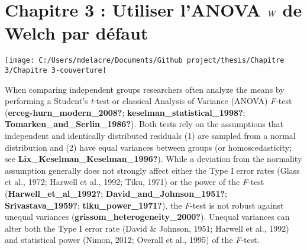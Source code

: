 \documentclass[
  english,
  man]{apa6}
\author{\phantom{0}}
\date{}
\affiliation{\phantom{0}}
\begin{document}
\hypertarget{chapitre-3-utiliser-lanova-bf-emph-w-de-welch-par-duxe9faut}{%
\section{\texorpdfstring{Chapitre 3 : Utiliser l'ANOVA \(\bf \emph W\) de Welch par défaut}{Chapitre 3 : Utiliser l'ANOVA \textbackslash bf \textbackslash emph W de Welch par défaut}}\label{chapitre-3-utiliser-lanova-bf-emph-w-de-welch-par-duxe9faut}}

\begin{center}\texttt{[image: C:/Users/mdelacre/Documents/Github project/thesis/Chapitre 3/Chapitre 3-couverture]} \end{center}

When comparing independent groups researchers often analyze the means by performing a Student's \emph{t}-test or classical Analysis of Variance (ANOVA) \emph{F}-test (\textbf{erceg-hurn\_modern\_2008?}; \textbf{keselman\_statistical\_1998?}; \textbf{Tomarken\_and\_Serlin\_1986?}). Both tests rely on the assumptions that independent and identically distributed residuals (1) are sampled from a normal distribution and (2) have equal variances between groups (or homoscedasticity; see \textbf{Lix\_Keselman\_Keselman\_1996?}). While a deviation from the normality assumption generally does not strongly affect either the Type I error rates (Glass et al., 1972; Harwell et al., 1992; Tiku, 1971) or the power of the \emph{F}-test (\textbf{Harwell\_et\_al\_1992?}; \textbf{David\_and\_Johnson\_1951?}; \textbf{Srivastava\_1959?}; \textbf{tiku\_power\_1971?}), the \emph{F}-test is not robust against unequal variances (\textbf{grissom\_heterogeneity\_2000?}). Unequal variances can alter both the Type I error rate (David \(\&\) Johnson, 1951; Harwell et al., 1992) and statistical power (Nimon, 2012; Overall et al., 1995) of the \emph{F}-test.
\end{document}
